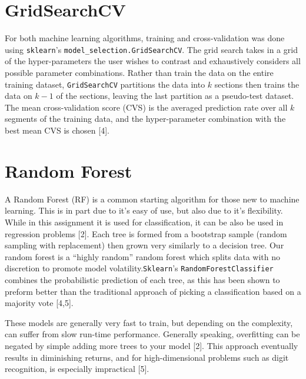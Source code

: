\documentclass{article}
\begin{document}
\section{GridSearchCV}
For both machine learning algorithms, training and cross-validation was done using \verb+sklearn+'s \verb+model_selection.GridSearchCV+. The grid search takes in a grid of the hyper-parameters the user wishes to contrast and exhaustively considers all possible parameter combinations. Rather than train the data on the entire training dataset, \verb+GridSearchCV+ partitions the data into $k$ sections then trains the data on $k-1$ of the sections, leaving the last partition as a pseudo-test dataset. The mean cross-validation score (CVS) is the averaged prediction rate over all $k$ segments of the training data, and the hyper-parameter combination with the best mean CVS is chosen [4]. 

\section{Random Forest}
A Random Forest (RF) is a common starting algorithm for those new to machine learning. This is in part due to it's easy of use, but also due to it's flexibility. While in this assignment it is used for classification, it can be also be used in regression problems [2]. Each tree is formed from a bootstrap sample (random sampling with replacement) then grown very similarly to a decision tree. Our random forest is a ``highly random'' random forest which splits data with no discretion to promote model volatility.\verb+Sklearn+'s \verb+RandomForestClassifier+ combines the probabilistic prediction of each tree, as this has been shown to preform better than the traditional approach of picking a classification based on a majority vote [4,5].

These models are generally very fast to train, but depending on the complexity, can suffer from slow run-time performance. Generally speaking, overfitting can be negated by simple adding more trees to your model [2]. This approach eventually results in diminishing returns, and for high-dimensional problems such as digit recognition, is especially impractical [5].
\end{document}
